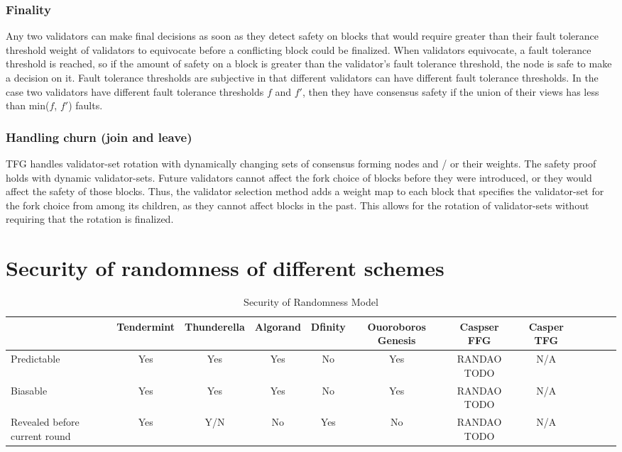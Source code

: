 \documentclass[10pt,journal,compsoc]{IEEEtran}
\begin{document}
\subsubsection{Finality}
Any two validators can make final decisions as soon as they detect safety on blocks that would require greater than their fault tolerance threshold weight of validators to equivocate before a conflicting block could be finalized. When validators equivocate, a fault tolerance threshold is reached, so if the amount of safety on a block is greater than the validator’s fault tolerance threshold, the node is safe to make a decision on it. Fault tolerance thresholds are subjective in that different validators can have different fault tolerance thresholds. In the case two validators have different fault tolerance thresholds $f$ and $f'$, then they have consensus safety if the union of their views has less than min($f$, $f'$) faults. 

\subsubsection{Handling churn (join and leave)}
TFG handles validator-set rotation with dynamically changing sets of consensus forming nodes and / or their weights. The safety proof holds with dynamic validator-sets. Future validators cannot affect the fork choice of blocks before they were introduced, or they would affect the safety of those blocks. Thus, the validator selection method adds a weight map to each block that specifies the validator-set for the fork choice from among its children, as they cannot affect blocks in the past. This allows for the rotation of validator-sets without requiring that the rotation is finalized. 

\section{Security of randomness of different schemes}

\begin{table*}[htp]
 \caption{Security of Randomness Model}
\label{}
\begin{tabularx}{\textwidth}{@{}l*{10}{c}c@{}}
\toprule
                 & Tendermint & Thunderella & Algorand & Dfinity & Ouoroboros Genesis  & Caspser FFG & Casper TFG   \\ 
\midrule
Predictable    & Yes  &  Yes & Yes   & No & Yes & RANDAO TODO & N/A   \\
\addlinespace
Biasable & Yes   & Yes  & Yes & No & Yes & RANDAO TODO & N/A \\ 
\addlinespace
Revealed before current round & Yes  & Y/N  & No & Yes & No & RANDAO TODO & N/A\\ 
\bottomrule
\end{tabularx}
\end{table*}
\end{document}
